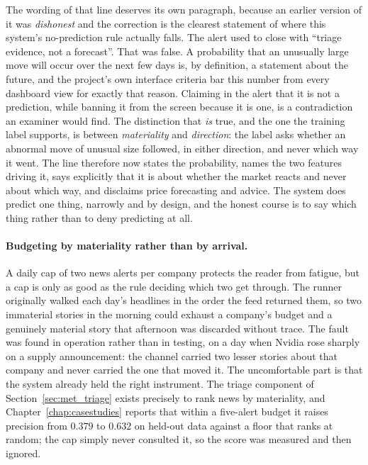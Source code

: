 The wording of that line deserves its own paragraph, because an earlier version of it was
\emph{dishonest} and the correction is the clearest statement of where this system's no-prediction rule
actually falls. The alert used to close with ``triage evidence, not a forecast''. That was false. A
probability that an unusually large move will occur over the next few days is, by definition, a statement
about the future, and the project's own interface criteria bar this number from every dashboard view for
exactly that reason. Claiming in the alert that it is not a prediction, while banning it from the screen
because it is one, is a contradiction an examiner would find. The distinction that \emph{is} true, and
the one the training label supports, is between \emph{materiality} and \emph{direction}: the label asks
whether an abnormal move of unusual size followed, in either direction, and never which way it went. The
line therefore now states the probability, names the two features driving it, says explicitly that it is
about whether the market reacts and never about which way, and disclaims price forecasting and advice.
The system does predict one thing, narrowly and by design, and the honest course is to say which thing
rather than to deny predicting at all.

\paragraph{Budgeting by materiality rather than by arrival.} A daily cap of two news alerts per
company protects the reader from fatigue, but a cap is only as good as the rule deciding which two
get through. The runner originally walked each day's headlines in the order the feed returned them,
so two immaterial stories in the morning could exhaust a company's budget and a genuinely material
story that afternoon was discarded without trace. The fault was found in operation rather than in
testing, on a day when Nvidia rose sharply on a supply announcement: the channel carried two lesser
stories about that company and never carried the one that moved it. The uncomfortable part is that
the system already held the right instrument. The triage component of Section~\ref{sec:met_triage}
exists precisely to rank news by materiality, and Chapter~\ref{chap:casestudies} reports that within
a five-alert budget it raises precision from $0.379$ to $0.632$ on held-out data against a floor
that ranks at random; the cap simply never consulted it, so the score was measured and then ignored.


